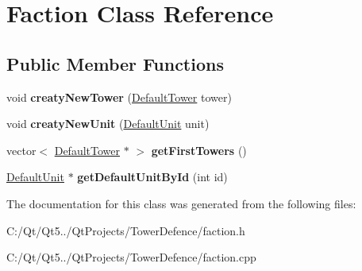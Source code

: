 \hypertarget{class_faction}{}\section{Faction Class Reference}
\label{class_faction}
\subsection*{Public Member Functions}
\begin{DoxyCompactItemize}
\item 
\hypertarget{class_faction_af2d8a38b8b83b62668c5555ea29ba9c9}{}void {\bfseries creaty\+New\+Tower} (\hyperlink{class_default_tower}{Default\+Tower} tower)\label{class_faction_af2d8a38b8b83b62668c5555ea29ba9c9}

\item 
\hypertarget{class_faction_a9afb237f77c304de5cb913625be9cdd0}{}void {\bfseries creaty\+New\+Unit} (\hyperlink{class_default_unit}{Default\+Unit} unit)\label{class_faction_a9afb237f77c304de5cb913625be9cdd0}

\item 
\hypertarget{class_faction_a4385d117f47a746a7ccfe6119f976f86}{}vector$<$ \hyperlink{class_default_tower}{Default\+Tower} $\ast$ $>$ {\bfseries get\+First\+Towers} ()\label{class_faction_a4385d117f47a746a7ccfe6119f976f86}

\item 
\hypertarget{class_faction_aaa2a03bc46c0a0c9de7d9c829f1e1be9}{}\hyperlink{class_default_unit}{Default\+Unit} $\ast$ {\bfseries get\+Default\+Unit\+By\+Id} (int id)\label{class_faction_aaa2a03bc46c0a0c9de7d9c829f1e1be9}

\end{DoxyCompactItemize}


The documentation for this class was generated from the following files\+:\begin{DoxyCompactItemize}
\item 
C\+:/\+Qt/\+Qt5../\+Qt\+Projects/\+Tower\+Defence/faction.\+h\item 
C\+:/\+Qt/\+Qt5../\+Qt\+Projects/\+Tower\+Defence/faction.\+cpp\end{DoxyCompactItemize}
